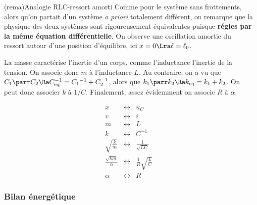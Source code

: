 \documentclass[../../main/main.tex]{subfiles}
\begin{document}
\begin{tcb}[label=rema:ressortlibre, sidebyside, righthand ratio=.6](rema){Analogie
			RLC-ressort amorti}
	Comme pour le système sans frottements, alors qu'on partait d'un système
	\textit{a priori} totalement différent, on remarque que la physique des deux
	systèmes sont rigoureusement équivalentes puisque \textbf{régies par la même
		équation différentielle}. On observe une oscillation amortie du ressort
	autour d'une position d'équilibre, ici $x=0 \Lra \ell = \ell_0$.
	\tcblower

	\begin{minipage}{0.6\linewidth}
		La masse caractérise l'inertie d'un corps, comme l'inductance l'inertie de
		la tension. On associe donc $m$ à l'inductance $L$. Au contraire, on a vu
		que $C_1 \parr C_2 \Ra C_{\rm eq}^{-1} = C_1{}^{-1} + C_2^{-1}$,
		alors que $k_1 \parr k_2 \Ra k_{\rm eq} = k_1 + k_2$. On peut donc
		associer $k$ à $1/C$. Finalement, assez évidemment on associe $R$ à $\alpha$.
	\end{minipage}
	\begin{minipage}{0.39\linewidth}
		\[
			\begin{array}{rlc}
				x                        & \longleftrightarrow & u_C                 \\
				v                        & \longleftrightarrow & i                   \\
				m                        & \longleftrightarrow & L                   \\
				k                        & \longleftrightarrow & C^{-1}              \\
				\sqrt{\frac{k}{m}}       & \longleftrightarrow & \frac{1}{\sqrt{LC}} \\
				\frac{\sqrt{km}}{\alpha} & \longleftrightarrow & \frac{1}{R}
				\sqrt{\frac{L}{C}}                                                   \\
				\alpha                   & \longleftrightarrow & R
			\end{array}
		\]
	\end{minipage}
\end{tcb}

\subsubsection{Bilan énergétique}
\end{document}
